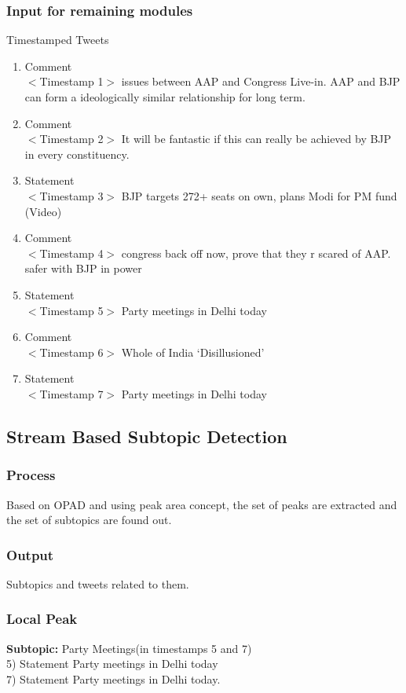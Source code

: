 \documentclass[conference]{IEEEtran}
\begin{document}
\subsubsection{\textbf{Input for remaining modules}}
Timestamped Tweets
\begin{enumerate}
\item{Comment\\$<$Timestamp 1$>$
issues between AAP and Congress Live-in. AAP and BJP can form a ideologically similar relationship for long term.}
\item{Comment\\$<$Timestamp 2$>$
It will be fantastic if this can really be achieved by BJP in every constituency. }
\item{Statement\\$<$Timestamp 3$>$
BJP targets 272+ seats on own, plans Modi for PM fund (Video)}
\item{Comment\\$<$Timestamp 4$>$
 congress back off now,  prove that they r scared of AAP.  safer with BJP in power}
 \item{Statement\\$<$Timestamp 5$>$
 Party meetings in Delhi today}
\item{Comment\\$<$Timestamp 6$>$
Whole of India `Disillusioned' }
\item{Statement\\$<$Timestamp 7$>$
Party meetings in Delhi today}
\end{enumerate}


\subsection{\textbf{Stream Based Subtopic Detection}}
\subsubsection{\textbf{Process}}
\par Based on OPAD and using peak area concept, the set of peaks are extracted and the set of subtopics are found out.

\subsubsection{\textbf{Output}}
Subtopics and tweets related to them.

\subsubsection{\textbf{Local Peak}}
\textbf{Subtopic:} Party Meetings(in timestamps 5 and 7)\\
5) Statement
Party meetings in Delhi today \\
7) Statement
Party meetings in Delhi today.
\end{document}
